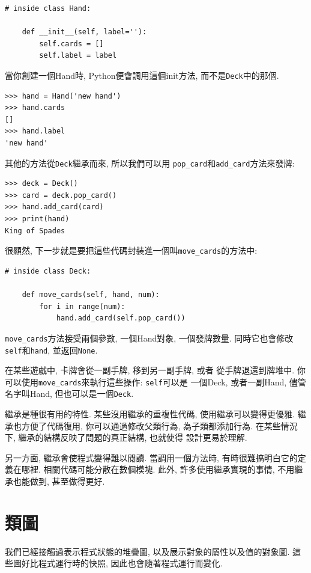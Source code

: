 \documentclass[10pt]{book}
\begin{document}
\begin{verbatim}
# inside class Hand:

    def __init__(self, label=''):
        self.cards = []
        self.label = label
\end{verbatim}
%
當你創建一個Hand時, Python便會調用這個init方法, 而不是{\tt Deck}中的那個. 

\begin{verbatim}
>>> hand = Hand('new hand')
>>> hand.cards
[]
>>> hand.label
'new hand'
\end{verbatim}
%
其他的方法從{\tt Deck}繼承而來, 所以我們可以用
\verb"pop_card"和\verb"add_card"方法來發牌:

\begin{verbatim}
>>> deck = Deck()
>>> card = deck.pop_card()
>>> hand.add_card(card)
>>> print(hand)
King of Spades
\end{verbatim}
%
很顯然, 下一步就是要把這些代碼封裝進一個叫\verb"move_cards"的方法中:

\begin{verbatim}
# inside class Deck:

    def move_cards(self, hand, num):
        for i in range(num):
            hand.add_card(self.pop_card())
\end{verbatim}
%

\verb"move_cards"方法接受兩個參數, 一個Hand對象, 一個發牌數量. 
同時它也會修改{\tt self}和{\tt hand}, 並返回{\tt None}.

在某些遊戲中, 卡牌會從一副手牌, 移到另一副手牌, 或者
從手牌退還到牌堆中. 
你可以使用\verb"move_cards"來執行這些操作: {\tt self}可以是
一個Deck, 或者一副Hand, 儘管名字叫Hand, 但也可以是一個{\tt Deck}.

繼承是種很有用的特性. 
某些沒用繼承的重複性代碼, 使用繼承可以變得更優雅. 
繼承也方便了代碼復用, 你可以通過修改父類行為, 
為子類都添加行為. 
在某些情況下, 繼承的結構反映了問題的真正結構, 也就使得
設計更易於理解. 

另一方面, 繼承會使程式變得難以閱讀. 
當調用一個方法時, 有時很難搞明白它的定義在哪裡. 
相關代碼可能分散在數個模塊. 
此外, 許多使用繼承實現的事情, 不用繼承也能做到, 甚至做得更好. 


\section{類圖}
\label{class.diagram}

我們已經接觸過表示程式狀態的堆疊圖, 以及展示對象的屬性以及值的對象圖. 
這些圖好比程式運行時的快照, 因此也會隨著程式運行而變化. 
\end{document}
